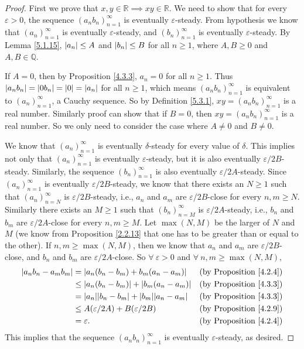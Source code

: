 \begin{proof}
First we prove that \(x, y \in \mathds{R} \implies xy \in \mathds{R}\).
We need to show that for every \(\varepsilon > 0\), the sequence \((a_n b_n)_{n = 1}^{\infty}\) is eventually \(\varepsilon\)-steady.
From hypothesis we know that \((a_n)_{n = 1}^{\infty}\) is eventually \(\varepsilon\)-steady, and \((b_n)_{n = 1}^{\infty}\) is eventually \(\varepsilon\)-steady.
By Lemma \ref{5.1.15}, \(\abs*{a_n} \leq A\) and \(\abs*{b_n} \leq B\) for all \(n \geq 1\), where \(A, B \geq 0\) and \(A, B \in \mathds{Q}\).

If \(A = 0\), then by Proposition \ref{4.3.3}, \(a_n = 0\) for all \(n \geq 1\).
Thus \(\abs*{a_n b_n} = \abs*{0b_n} = \abs*{0} = \abs*{a_n}\) for all \(n \geq 1\), which means \((a_n b_n)_{n = 1}^{\infty}\) is equivalent to \((a_n)_{n = 1}^{\infty}\), a Cauchy sequence.
So by Definition \ref{5.3.1}, \(xy = (a_n b_n)_{n = 1}^{\infty}\) is a real number.
Similarly proof can show that if \(B = 0\), then \(xy = (a_n b_n)_{n = 1}^{\infty}\) is a real number.
So we only need to consider the case where \(A \neq 0\) and \(B \neq 0\).

We know that \((a_n)_{n = 1}^{\infty}\) is eventually \(\delta\)-steady for every value of \(\delta\).
This implies not only that \((a_n)_{n = 1}^{\infty}\) is eventually \(\varepsilon\)-steady, but it is also eventually \(\varepsilon / 2B\)-steady.
Similarly, the sequence \((b_n)_{n = 1}^{\infty}\) is also eventually \(\varepsilon / 2A\)-steady.
Since \((a_n)_{n = 1}^{\infty}\) is eventually \(\varepsilon / 2B\)-steady, we know that there exists an \(N \geq 1\) such that \((a_n)_{n = N}^{\infty}\) is \(\varepsilon / 2B\)-steady, i.e., \(a_n\) and \(a_m\) are \(\varepsilon / 2B\)-close for every \(n, m \geq N\).
Similarly there exists an \(M \geq 1\) such that \((b_n)_{n = M}^{\infty}\) is \(\varepsilon / 2A\)-steady, i.e., \(b_n\) and \(b_m\) are \(\varepsilon / 2A\)-close for every \(n, m \geq M\).
Let \(\max(N, M)\) be the larger of \(N\) and \(M\)
(we know from Proposition \ref{2.2.13} that one has to be greater than or equal to the other).
If \(n, m \geq \max(N, M)\), then we know that \(a_n\) and \(a_m\) are \(\varepsilon / 2B\)-close, and \(b_n\) and \(b_m\) are \(\varepsilon / 2A\)-close.
So \(\forall\ \varepsilon > 0\) and \(\forall\ n, m \geq \max(N, M)\),
\begin{align*}
\abs*{a_n b_n - a_m b_m} &= \abs*{a_n (b_n - b_m) + b_m (a_n - a_m)} & \text{(by Proposition \ref{4.2.4})} \\
&\leq \abs*{a_n (b_n - b_m)} + \abs*{b_m (a_n - a_m)} & \text{(by Proposition \ref{4.3.3})} \\
&= \abs*{a_n}\abs*{b_n - b_m} + \abs*{b_m}\abs*{a_n - a_m} & \text{(by Proposition \ref{4.3.3})} \\
&\leq A(\varepsilon / 2A) + B(\varepsilon / 2B) & \text{(by Proposition \ref{4.2.9})} \\
&= \varepsilon. & \text{(by Proposition \ref{4.2.4})}
\end{align*}
This implies that the sequence \((a_n b_n)_{n = 1}^{\infty}\) is eventually \(\varepsilon\)-steady, as desired.


\end{proof}
